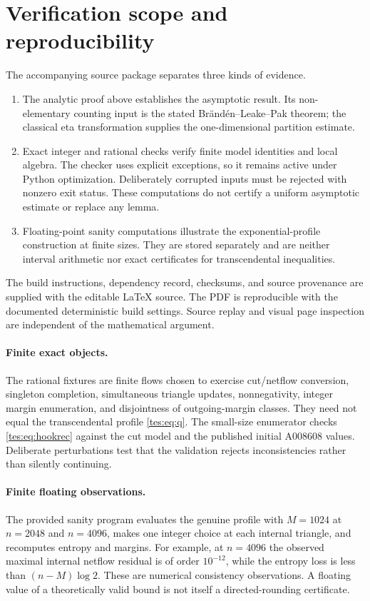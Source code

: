 \documentclass[11pt,a4paper]{article}
\theoremstyle{remark}\newtheorem{remark}[theorem]{Remark}
\numberwithin{equation}{section}
\begin{document}
\section{Verification scope and reproducibility}\label{tes:sec:verification}
The accompanying source package separates three kinds of evidence.
\begin{enumerate}[leftmargin=*,itemsep=4pt]
\item The analytic proof above establishes the asymptotic result. Its non-elementary counting input is the stated Br\"and\'en--Leake--Pak theorem; the classical eta transformation supplies the one-dimensional partition estimate.
\item Exact integer and rational checks verify finite model identities and local algebra. The checker uses explicit exceptions, so it remains active under Python optimization. Deliberately corrupted inputs must be rejected with nonzero exit status. These computations do not certify a uniform asymptotic estimate or replace any lemma.
\item Floating-point sanity computations illustrate the exponential-profile construction at finite sizes. They are stored separately and are neither interval arithmetic nor exact certificates for transcendental inequalities.
\end{enumerate}
The build instructions, dependency record, checksums, and source provenance are supplied with the editable \LaTeX{} source. The PDF is reproducible with the documented deterministic build settings. Source replay and visual page inspection are independent of the mathematical argument.

\paragraph{Finite exact objects.}
The rational fixtures are finite flows chosen to exercise cut/netflow conversion, singleton completion, simultaneous triangle updates, nonnegativity, integer margin enumeration, and disjointness of outgoing-margin classes. They need not equal the transcendental profile \eqref{tes:eq:q}. The small-size enumerator checks \eqref{tes:eq:hookrec} against the cut model and the published initial A008608 values. Deliberate perturbations test that the validation rejects inconsistencies rather than silently continuing.

\paragraph{Finite floating observations.}
The provided sanity program evaluates the genuine profile with $M=1024$ at $n=2048$ and $n=4096$, makes one integer choice at each internal triangle, and recomputes entropy and margins. For example, at $n=4096$ the observed maximal internal netflow residual is of order $10^{-12}$, while the entropy loss is less than $(n-M)\log2$. These are numerical consistency observations. A floating value of a theoretically valid bound is not itself a directed-rounding certificate.
\end{document}
